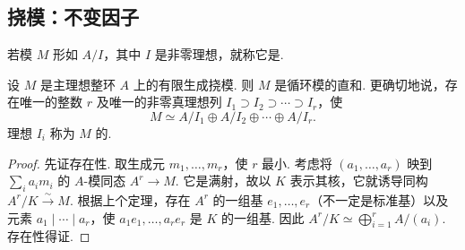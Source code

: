 \subsection{挠模：不变因子}\label{sec:galois-1-10-5}
若模 $M$ 形如 $A/I$，其中 $I$ 是非零理想，就称它是.
\begin{corollary*}
设 $M$ 是主理想整环 $A$ 上的有限生成挠模. 则 $M$ 是循环模的直和. 更确切地说，存在唯一的整数 $r$ 及唯一的非零真理想列 $I_1\supset I_2\supset\cdots\supset I_r$，使
\[M\simeq A/I_1\oplus A/I_2\oplus\cdots\oplus A/I_r.\]
理想 $I_i$ 称为 $M$ 的.
\end{corollary*}
\begin{proof}
先证存在性. 取生成元 $m_1,\ldots,m_r$，使 $r$ 最小. 考虑将 $(a_1,\ldots,a_r)$ 映到 $\sum_i a_im_i$ 的 $A$-模同态 $A^r\longrightarrow M$. 它是满射，故以 $K$ 表示其核，它就诱导同构 $A^r/K\xrightarrow{\sim}M$. 根据上个定理，存在 $A^r$ 的一组基 $e_1,\ldots,e_r$（不一定是标准基）以及元素 $a_1\mid\cdots\mid a_r$，使 $a_1e_1,\ldots,a_re_r$ 是 $K$ 的一组基. 因此 $A^r/K\simeq\bigoplus_{i=1}^r A/(a_i)$. 存在性得证.


\end{proof}
